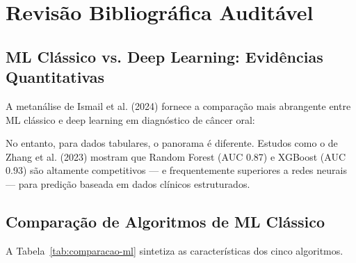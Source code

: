\section{Revisão Bibliográfica Auditável}

\subsection{ML Clássico vs. Deep Learning: Evidências Quantitativas}

A metanálise de Ismail et al. (2024) \cite{ODT-023} fornece a comparação mais abrangente entre ML clássico e deep learning em diagnóstico de câncer oral:


No entanto, para dados tabulares, o panorama é diferente. Estudos como o de Zhang et al. (2023) \cite{ODT-025} mostram que Random Forest (AUC 0.87) e XGBoost (AUC 0.93) são altamente competitivos — e frequentemente superiores a redes neurais — para predição baseada em dados clínicos estruturados.

\subsection{Comparação de Algoritmos de ML Clássico}

A Tabela~\ref{tab:comparacao-ml} sintetiza as características dos cinco algoritmos.

